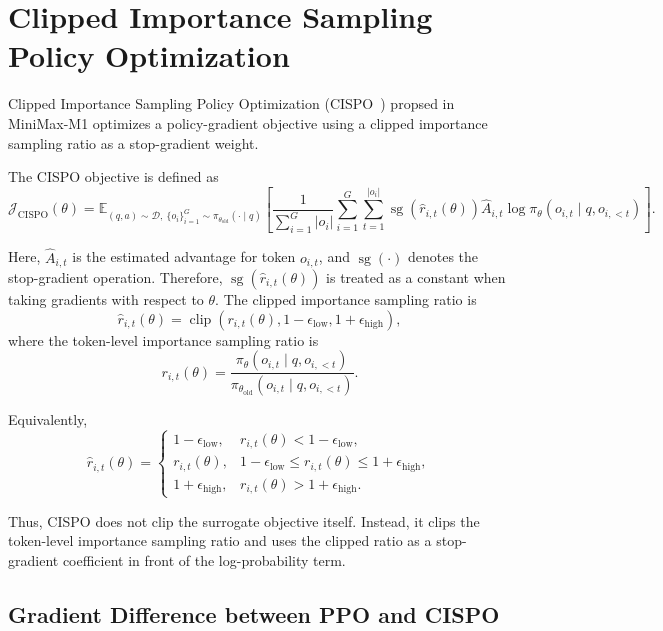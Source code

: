 \section{Clipped Importance Sampling Policy Optimization}

Clipped Importance Sampling Policy Optimization (CISPO~\citep{minimax2025minimaxm1scalingtesttimecompute}) propsed in MiniMax-M1 optimizes a policy-gradient objective using a clipped importance sampling ratio as a stop-gradient weight.

The CISPO objective is defined as
\[
\mathcal{J}_{\mathrm{CISPO}}(\theta)
=
\mathbb{E}_{(q,a)\sim \mathcal{D},\ \{o_i\}_{i=1}^{G}\sim \pi_{\theta_{\mathrm{old}}}(\cdot\mid q)}
\left[
    \frac{1}{\sum_{i=1}^{G}|o_i|}
    \sum_{i=1}^{G}
    \sum_{t=1}^{|o_i|}
    \operatorname{sg}\!\left(\hat r_{i,t}(\theta)\right)
    \hat A_{i,t}
    \log \pi_\theta(o_{i,t}\mid q,o_{i,<t})
\right].
\]

Here, $\hat A_{i,t}$ is the estimated advantage for token $o_{i,t}$, and $\operatorname{sg}(\cdot)$ denotes the stop-gradient operation. Therefore, $\operatorname{sg}\!\left(\hat r_{i,t}(\theta)\right)$ is treated as a constant when taking gradients with respect to $\theta$. The clipped importance sampling ratio is
\[
    \hat r_{i,t}(\theta)
    =
    \operatorname{clip}
    \left(
        r_{i,t}(\theta),
        1-\epsilon_{\mathrm{low}},
        1+\epsilon_{\mathrm{high}}
    \right),
\]
where the token-level importance sampling ratio is
\[
    r_{i,t}(\theta)
    =
    \frac{
        \pi_\theta(o_{i,t}\mid q,o_{i,<t})
    }{
        \pi_{\theta_{\mathrm{old}}}(o_{i,t}\mid q,o_{i,<t})
    }.
\]

Equivalently,
\[
    \hat r_{i,t}(\theta)
    =
    \begin{cases}
    1-\epsilon_{\mathrm{low}},
    &
    r_{i,t}(\theta) < 1-\epsilon_{\mathrm{low}},
    \\[4pt]
    r_{i,t}(\theta),
    &
    1-\epsilon_{\mathrm{low}}
    \leq r_{i,t}(\theta)
    \leq 1+\epsilon_{\mathrm{high}},
    \\[4pt]
    1+\epsilon_{\mathrm{high}},
    &
    r_{i,t}(\theta) > 1+\epsilon_{\mathrm{high}}.
    \end{cases}
\]

Thus, CISPO does not clip the surrogate objective itself. Instead, it clips the token-level importance sampling ratio and uses the clipped ratio as a stop-gradient coefficient in front of the log-probability term.

\subsection{Gradient Difference between PPO and CISPO}

